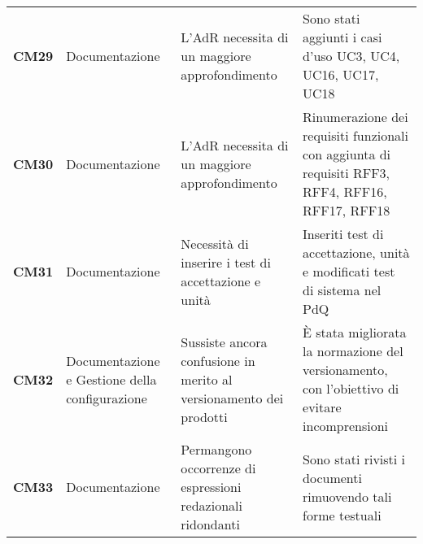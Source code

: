 \documentclass[../piano-di-qualifica.tex]{subfiles}
\begin{document}
\begin{longtable}[H]{>{\centering\bfseries}m{2.5cm} >{\centering}m{2.5cm} >{\centering}m{5.5cm} >{\centering\arraybackslash}m{5.5cm}}
CM29 & Documentazione                                & L’AdR necessita di un maggiore approfondimento                                                                                                                                & Sono stati aggiunti i casi d’uso UC3, UC4, UC16, UC17, UC18                                                                                                                                                                                                                                                                                         \\
CM30 & Documentazione                                & L’AdR necessita di un maggiore approfondimento                                                                                                                                & Rinumerazione dei requisiti funzionali con aggiunta di requisiti RFF3, RFF4, RFF16, RFF17, RFF18                                                                                                                                                                                                                                                    \\
CM31 & Documentazione                                & Necessità di inserire i test di accettazione e unità                                                                                                                          & Inseriti test di accettazione, unità e modificati test di sistema nel PdQ                                                                                                                                                                                                                                                                           \\
CM32 & Documentazione e Gestione della configurazione & Sussiste ancora confusione in merito al versionamento dei prodotti                                                                                                           & È stata migliorata la normazione del versionamento, con l'obiettivo di evitare incomprensioni                                                                                                                                                                                                                                                               \\
CM33 & Documentazione                                & Permangono occorrenze di espressioni redazionali ridondanti                                                                                                                   & Sono stati rivisti i documenti rimuovendo tali forme testuali                                                                                                                                                                                                                                                                                       \\

\end{longtable}
\end{document}
